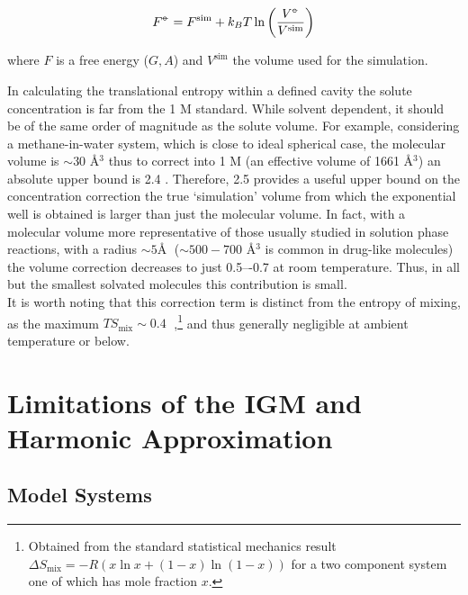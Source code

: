 \documentclass[../main.tex]{subfiles}
\begin{document}
\begin{equation}
	F^{{\circ\kern-0.495em-}} = F^\text{sim} + k_BT \ln\left(\frac{V^{\circ\kern-0.495em-}}{V^\text{sim}}\right)
\end{equation}

where $F$ is a free energy ($G, A$) and $V^\text{sim}$ the volume used for the simulation. 

In calculating the translational entropy within a defined cavity the solute concentration is far from the 1 M standard. While solvent dependent, it should be of the same order of magnitude as the solute volume. For example, considering a methane-in-water system, which is close to ideal spherical case, the molecular volume is $\sim 30$ \AA$^3$\cite{Zhao2003} thus to correct into 1 M (an effective volume of 1661 \AA$^3$) an absolute upper bound is 2.4 \kcal. 
Therefore, 2.5 \kcalx provides a useful upper bound on the concentration correction the true `simulation' volume from which the exponential well is obtained is larger than just the molecular volume. In fact, with a molecular volume more representative of those usually studied in solution phase reactions, with a radius $\sim 5 $\AA$\;$  ($\sim 500-700$ \AA$^3$ is common in drug-like molecules\cite{Khanna2009}) the volume correction decreases to just 0.5–-0.7 \kcalx at room temperature. Thus, in all but the smallest solvated molecules this contribution is small.
\\
It is worth noting that this correction term is distinct from the entropy of mixing, as the maximum $TS_\text{mix} \sim 0.4\;$ \kcal,\footnote{Obtained from the standard statistical mechanics result $\Delta S_\text{mix} = -R(x \ln x + (1-x)\ln(1 - x))$ for a two component system one of which has mole fraction $x$.}  and thus generally negligible at ambient temperature or below.


\section{Limitations of the IGM and Harmonic Approximation}
\subsection{Model Systems}
\end{document}
